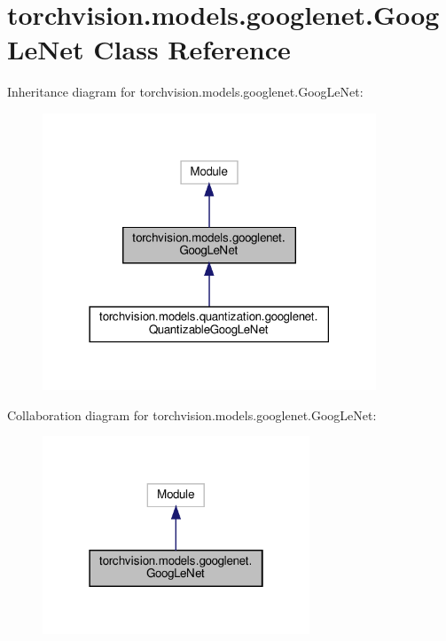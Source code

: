 \hypertarget{classtorchvision_1_1models_1_1googlenet_1_1GoogLeNet}{}\section{torchvision.\+models.\+googlenet.\+Goog\+Le\+Net Class Reference}
\label{classtorchvision_1_1models_1_1googlenet_1_1GoogLeNet}


Inheritance diagram for torchvision.\+models.\+googlenet.\+Goog\+Le\+Net\+:
\nopagebreak
\begin{figure}[H]
\begin{center}
\leavevmode
\includegraphics[width=282pt]{classtorchvision_1_1models_1_1googlenet_1_1GoogLeNet__inherit__graph}
\end{center}
\end{figure}


Collaboration diagram for torchvision.\+models.\+googlenet.\+Goog\+Le\+Net\+:
\nopagebreak
\begin{figure}[H]
\begin{center}
\leavevmode
\includegraphics[width=226pt]{classtorchvision_1_1models_1_1googlenet_1_1GoogLeNet__coll__graph}
\end{center}
\end{figure}
